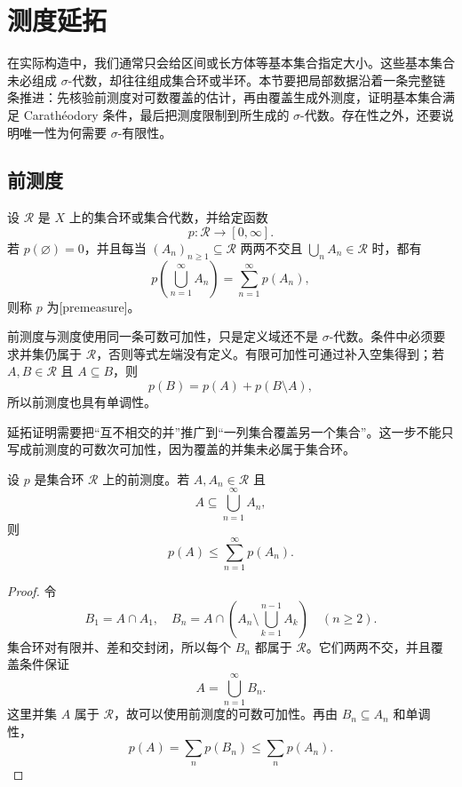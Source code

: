 \section{测度延拓}
\label{b1:sec:0204}

在实际构造中，我们通常只会给区间或长方体等基本集合指定大小。这些基本集合未必组成 \(\sigma\)-代数，却往往组成集合环或半环。本节要把局部数据沿着一条完整链条推进：先核验前测度对可数覆盖的估计，再由覆盖生成外测度，证明基本集合满足 Carathéodory 条件，最后把测度限制到所生成的 \(\sigma\)-代数。存在性之外，还要说明唯一性为何需要 \(\sigma\)-有限性。

\subsection{前测度}
\label{b1:subsec:020401}

\begin{definition}
\label{b1:def:premeasure}
设 \(\mathcal R\) 是 \(X\) 上的集合环或集合代数，并给定函数
\[
p:\mathcal R\longrightarrow[0,\infty].
\]
若 \(p(\varnothing)=0\)，并且每当 \((A_n)_{n\geq1}\subseteq\mathcal R\) 两两不交且 \(\bigcup_nA_n\in\mathcal R\) 时，都有
\[
p\left(\bigcup_{n=1}^{\infty}A_n\right)
=\sum_{n=1}^{\infty}p(A_n),
\]
则称 \(p\) 为[premeasure]。
\end{definition}

前测度与测度使用同一条可数可加性，只是定义域还不是 \(\sigma\)-代数。条件中必须要求并集仍属于 \(\mathcal R\)，否则等式左端没有定义。有限可加性可通过补入空集得到；若 \(A,B\in\mathcal R\) 且 \(A\subseteq B\)，则
\[
p(B)=p(A)+p(B\setminus A),
\]
所以前测度也具有单调性。

\ProseParagraphBreak

延拓证明需要把“互不相交的并”推广到“一列集合覆盖另一个集合”。这一步不能只写成前测度的可数次可加性，因为覆盖的并集未必属于集合环。

\begin{lemma}
\label{b1:lem:premeasure-cover}
设 \(p\) 是集合环 \(\mathcal R\) 上的前测度。若 \(A,A_n\in\mathcal R\) 且
\[
A\subseteq\bigcup_{n=1}^{\infty}A_n,
\]
则
\[
p(A)\leq\sum_{n=1}^{\infty}p(A_n).
\]
\end{lemma}
\begin{proof}
令
\[
B_1=A\cap A_1,
\quad
B_n=A\cap\left(A_n\setminus\bigcup_{k=1}^{n-1}A_k\right)\quad(n\geq2).
\]
集合环对有限并、差和交封闭，所以每个 \(B_n\) 都属于 \(\mathcal R\)。它们两两不交，并且覆盖条件保证
\[
A=\bigcup_{n=1}^{\infty}B_n.
\]
这里并集 \(A\) 属于 \(\mathcal R\)，故可以使用前测度的可数可加性。再由 \(B_n\subseteq A_n\) 和单调性，
\[
p(A)=\sum_np(B_n)\leq\sum_np(A_n).
\]
\end{proof}

